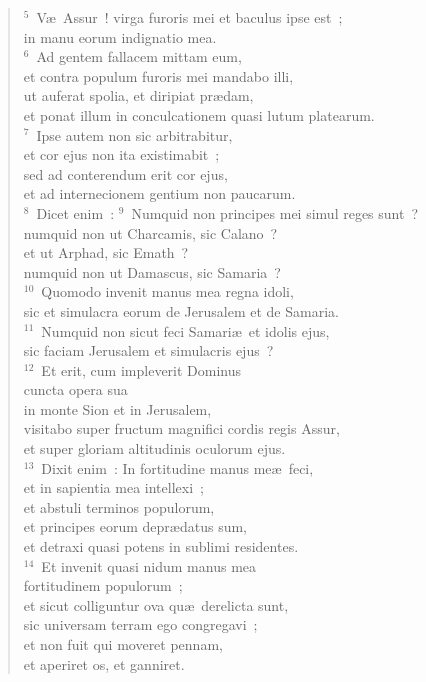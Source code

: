 \begin{flushleft}\begin{verse}${}^{5}$~V\ae\ Assur~! virga furoris mei et baculus ipse est~;\\ in manu eorum indignatio mea.\\
${}^{6}$~Ad gentem fallacem mittam eum,\\ et contra populum furoris mei mandabo illi,\\ ut auferat spolia, et diripiat pr\ae dam,\\ et ponat illum in conculcationem quasi lutum platearum.\\
${}^{7}$~Ipse autem non sic arbitrabitur,\\ et cor ejus non ita existimabit~;\\ sed ad conterendum erit cor ejus,\\ et ad internecionem gentium non paucarum.\\
${}^{8}$~Dicet enim~:
${}^{9}$~Numquid non principes mei simul reges sunt~?\\ numquid non ut Charcamis, sic Calano~?\\ et ut Arphad, sic Emath~?\\ numquid non ut Damascus, sic Samaria~?\\
${}^{10}$~Quomodo invenit manus mea regna idoli,\\ sic et simulacra eorum de Jerusalem et de Samaria.\\
${}^{11}$~Numquid non sicut feci Samari\ae\ et idolis ejus,\\ sic faciam Jerusalem et simulacris ejus~?\\
${}^{12}$~Et erit, cum impleverit Dominus\\ cuncta opera sua\\ in monte Sion et in Jerusalem,\\ visitabo super fructum magnifici cordis regis Assur,\\ et super gloriam altitudinis oculorum ejus.\\
${}^{13}$~Dixit enim~: In fortitudine manus me\ae\ feci,\\ et in sapientia mea intellexi~;\\ et abstuli terminos populorum,\\ et principes eorum depr\ae datus sum,\\ et detraxi quasi potens in sublimi residentes.\\
${}^{14}$~Et invenit quasi nidum manus mea\\ fortitudinem populorum~;\\ et sicut colliguntur ova qu\ae\ derelicta sunt,\\ sic universam terram ego congregavi~;\\ et non fuit qui moveret pennam,\\ et aperiret os, et ganniret.\\

\end{verse}
\end{flushleft}
